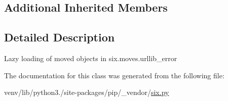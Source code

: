 \subsection*{Additional Inherited Members}


\subsection{Detailed Description}
\begin{DoxyVerb}Lazy loading of moved objects in six.moves.urllib_error\end{DoxyVerb}
 

The documentation for this class was generated from the following file\+:\begin{DoxyCompactItemize}
\item 
venv/lib/python3./site-\/packages/pip/\+\_\+vendor/\hyperlink{pip_2__vendor_2six_8py}{six.\+py}\end{DoxyCompactItemize}
